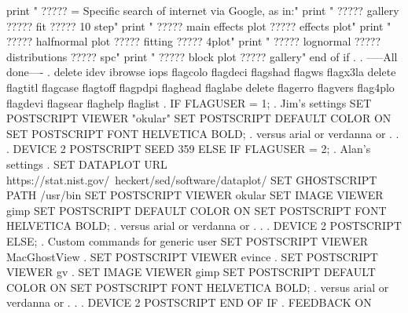    print "  ????? = Specific search of internet via Google, as in:"
   print "          ????? gallery   ????? fit   ????? 10 step"
   print "          ????? main effects plot   ????? effects plot"
   print "          ????? halfnormal plot     ????? fitting   ????? 4plot"
   print "          ????? lognormal   ????? distributions   ????? spc"
   print "          ????? block plot   ????? gallery"
end of if
.
. -----All done----
.
delete idev ibrowse iops flagcolo flagdeci flagshad flagws flagx3la
delete flagtitl flagcase flagtoff flagpdpi flaghead flaglabe
delete flagerro flagvers flag4plo flagdevi flagsear flaghelp flaglist
.
IF FLAGUSER = 1; . Jim's settings
   SET POSTSCRIPT VIEWER "okular"
   SET POSTSCRIPT DEFAULT COLOR ON
   SET POSTSCRIPT FONT HELVETICA BOLD; . versus arial or verdanna or . . .
   DEVICE 2 POSTSCRIPT
   SEED 359
ELSE IF FLAGUSER = 2; . Alan's settings
   . SET DATAPLOT URL https://stat.nist.gov/~heckert/sed/software/dataplot/
   SET GHOSTSCRIPT PATH /usr/bin
   SET POSTSCRIPT VIEWER okular
   SET IMAGE VIEWER gimp
   SET POSTSCRIPT DEFAULT COLOR ON
   SET POSTSCRIPT FONT HELVETICA BOLD; . versus arial or verdanna or . . .
   DEVICE 2 POSTSCRIPT
ELSE; . Custom commands for generic user
   SET POSTSCRIPT VIEWER MacGhostView
   . SET POSTSCRIPT VIEWER evince
   . SET POSTSCRIPT VIEWER gv
   . SET IMAGE VIEWER gimp
   SET POSTSCRIPT DEFAULT COLOR ON
   SET POSTSCRIPT FONT HELVETICA BOLD; . versus arial or verdanna or . . .
   DEVICE 2 POSTSCRIPT
END OF IF
.
FEEDBACK ON
